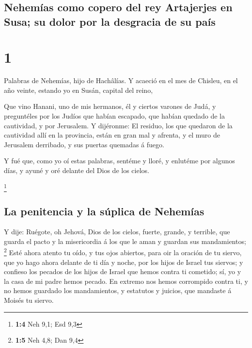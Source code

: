 \hypertarget{nehemuxedas-como-copero-del-rey-artajerjes-en-susa-su-dolor-por-la-desgracia-de-su-pauxeds}{%
\subsection{Nehemías como copero del rey Artajerjes en Susa; su dolor
por la desgracia de su
país}\label{nehemuxedas-como-copero-del-rey-artajerjes-en-susa-su-dolor-por-la-desgracia-de-su-pauxeds}}

\hypertarget{section}{%
\section{1}\label{section}}

 Palabras de Nehemías, hijo de Hachâlías. Y acaeció en el
mes de Chisleu, en el año veinte, estando yo en Susán, capital del
reino,

 Que vino Hanani, uno de mis hermanos, él y ciertos varones
de Judá, y preguntéles por los Judíos que habían escapado, que habían
quedado de la cautividad, y por Jerusalem.  Y dijéronme: El
residuo, los que quedaron de la cautividad allí en la provincia, están
en gran mal y afrenta, y el muro de Jerusalem derribado, y sus puertas
quemadas á fuego.

 Y fué que, como yo oí estas palabras, sentéme y lloré, y
enlutéme por algunos días, y ayuné y oré delante del Dios de los cielos.

\footnote{\textbf{1:4} Neh 9,1; Esd 9,3}

\hypertarget{la-penitencia-y-la-suxfaplica-de-nehemuxedas}{%
\subsection{La penitencia y la súplica de
Nehemías}\label{la-penitencia-y-la-suxfaplica-de-nehemuxedas}}

 Y dije: Ruégote, oh Jehová, Dios de los cielos, fuerte,
grande, y terrible, que guarda el pacto y la misericordia á los que le
aman y guardan sus mandamientos; \footnote{\textbf{1:5} Neh 4,8; Dan 9,4}
 Esté ahora atento tu oído, y tus ojos abiertos, para oir la
oración de tu siervo, que yo hago ahora delante de ti día y noche, por
los hijos de Israel tus siervos; y confieso los pecados de los hijos de
Israel que hemos contra ti cometido; sí, yo y la casa de mi padre hemos
pecado.  En extremo nos hemos corrompido contra ti, y no
hemos guardado los mandamientos, y estatutos y juicios, que mandaste á
Moisés tu siervo.

